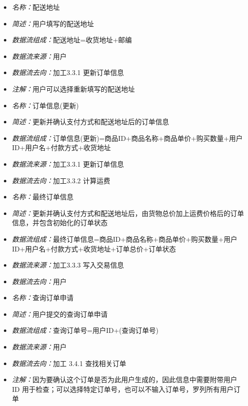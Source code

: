 \vspace{-1mm}

\begin{itemize}
	\item \textit{名称：}配送地址
	\item \textit{简述：}用户填写的配送地址
	\item \textit{数据流组成：}配送地址=收货地址+邮编
	\item \textit{数据流来源：}用户
	\item \textit{数据流去向：}加工3.3.1 更新订单信息
	\item \textit{注解：}用户可以选择重新填写的配送地址
\end{itemize}

\vspace{-1mm}

\begin{itemize}
	\item \textit{名称：}订单信息(更新)
	\item \textit{简述：}更新并确认支付方式和配送地址后的订单信息
	\item \textit{数据流组成：}订单信息(更新)=商品ID+商品名称+商品单价+购买数量+用户ID+用户名+付款方式+收货地址
	\item \textit{数据流来源：}加工3.3.1 更新订单信息
	\item \textit{数据流去向：}加工3.3.2 计算运费
\end{itemize}

\vspace{-1mm}

\begin{itemize}
	\item \textit{名称：}最终订单信息
	\item \textit{简述：}更新并确认支付方式和配送地址后，由货物总价加上运费价格后的订单信息，并包含初始化的订单状态
	\item \textit{数据流组成：}最终订单信息=商品ID+商品名称+商品单价+购买数量+用户ID+用户名+付款方式+收货地址+订单总价+订单状态
	\item \textit{数据流来源：}加工3.3.3 写入交易信息
	\item \textit{数据流去向：}用户
\end{itemize}

\vspace{-1mm}

\begin{itemize}
	\item \textit{名称：}查询订单申请
	\item \textit{简述：}用户提交的查询订单申请
	\item \textit{数据流组成：}查询订单号=用户ID+(查询订单号)
	\item \textit{数据流来源：}用户
	\item \textit{数据流去向：}加工 3.4.1 查找相关订单
	\item \textit{注解：}因为要确认这个订单是否为此用户生成的，因此信息中需要附带用户 ID 用于检查；可以选择特定订单号，也可以不输入订单号，罗列所有用户订单
\end{itemize}

